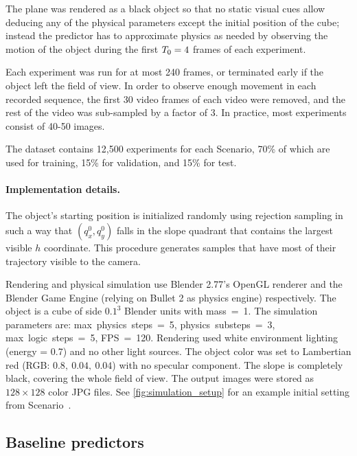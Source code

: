 
%

The plane was rendered as a black object so that no static visual cues allow deducing any of the physical parameters except the initial position of the cube; instead the predictor has to approximate physics as needed by observing the motion of the object during the first $T_0=4$ frames of each experiment.

Each experiment was run for at most 240 frames, or terminated early if the object left the field of view. In order to observe enough movement in each recorded sequence, the first 30 video frames of each video were removed, and the rest of the video was sub-sampled by a factor of 3. In practice, most experiments consist of 40-50 images. 

The dataset contains 12,500 experiments for each Scenario, 70\% of which are used for training,  15\% for validation, and 15\% for test.

\paragraph{Implementation details.}
The object's starting position is initialized randomly using rejection sampling in such a way that $(q_x^0,q_y^0)$ falls in the slope quadrant that contains the largest visible $h$ coordinate. %
This procedure generates samples that have most of their trajectory visible to the camera.

Rendering and physical simulation use Blender 2.77's OpenGL renderer and the Blender Game Engine (relying on Bullet 2 as physics engine) respectively. The object is a cube of side $0.1^3$ Blender units with \mbox{mass = 1}. The simulation parameters are: \mbox{max physics steps = 5}, \mbox{physics substeps = 3}, \mbox{max logic steps = 5}, \mbox{FPS = 120}. Rendering used white environment lighting (energy = 0.7) and no other light sources. The object color was set to Lambertian red (RGB: $0.8,~0.04,~0.04$) with no specular component. The slope is completely black, covering the whole field of view. The output images were stored as $128\times128$ color JPG files. See \cref{fig:simulation_setup} for an example initial setting from \mbox{Scenario~\stwo}. 

\subsection{Baseline predictors}\label{sec:networks}
